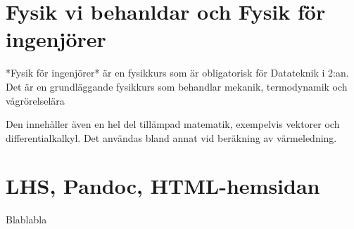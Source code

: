 \section{Fysik vi behanldar och Fysik för ingenjörer}

*Fysik för ingenjörer* är en fysikkurs som är obligatorisk för Datateknik i 2:an. Det är en grundläggande fysikkurs som behandlar mekanik, termodynamik och vågrörelselära

Den innehåller även en hel del tillämpad matematik, exempelvis vektorer och differentialkalkyl. Det användas bland annat vid beräkning av värmeledning.

\section{LHS, Pandoc, HTML-hemsidan}

Blablabla